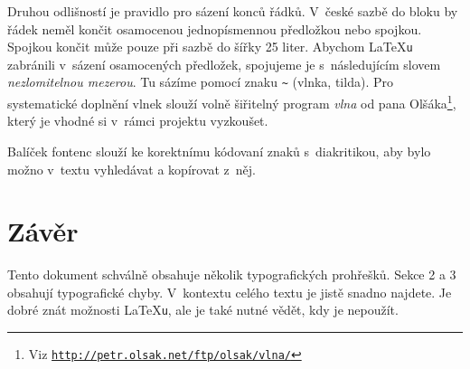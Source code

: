 \documentclass[hidelinks, twocolumn, 10pt, a4paper]{article}[24.02.2022]
\begin{document}
            Druhou odlišností je pravidlo pro sázení konců řádků. V~české sazbě do bloku by řádek neměl končit osamocenou jednopísmennou předložkou nebo spojkou. Spojkou  končit může pouze při sazbě do šířky 25 liter. Abychom \LaTeX\verb|u| zabránili v~sázení osamocených předložek, spojujeme je s~následujícím slovem \emph{nezlomitelnou mezerou}. Tu sázíme pomocí znaku \verb|~| (vlnka, tilda). Pro systematické doplnění vlnek slouží volně šiřitelný program \emph{vlna} od pana Olšáka\footnote[2]{Viz \href{http://petr.olsak.net/ftp/olsak/vlna/}{\texttt{http://petr.olsak.net/ftp/olsak/vlna/}}}, který je vhodné si v~rámci projektu vyzkoušet. 
            
            Balíček fontenc slouží ke korektnímu kódovaní znaků s~diakritikou, aby bylo možno v~textu vyhledávat a kopírovat z~něj.
            
        \section{Závěr}
            Tento dokument schválně obsahuje několik typografických prohřešků. Sekce 2 a 3 obsahují typografické chyby. V~kontextu celého textu je jistě snadno najdete. Je dobré znát možnosti \LaTeX\verb|u|, ale je také nutné vědět, kdy je nepoužít. 
            

\end{document}
